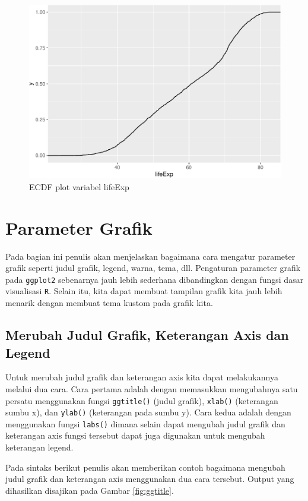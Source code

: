 \documentclass[]{book}
\begin{document}
\begin{figure}

{\centering \includegraphics[width=0.7\linewidth]{EnvStat_files/figure-latex/ggecdf-1} 

}

\caption{ECDF plot variabel lifeExp}\label{fig:ggecdf}
\end{figure}

\section{Parameter Grafik}\label{parameter-grafik}

Pada bagian ini penulis akan menjelaskan bagaimana cara mengatur
parameter grafik seperti judul grafik, legend, warna, tema, dll.
Pengaturan parameter grafik pada \texttt{ggplot2} sebenarnya jauh lebih
sederhana dibandingkan dengan fungsi dasar visualisasi \texttt{R}.
Selain itu, kita dapat membuat tampilan grafik kita jauh lebih menarik
dengan membuat tema kustom pada grafik kita.

\subsection{Merubah Judul Grafik, Keterangan Axis dan
Legend}\label{merubah-judul-grafik-keterangan-axis-dan-legend}

Untuk merubah judul grafik dan keterangan axis kita dapat melakukannya
melalui dua cara. Cara pertama adalah dengan memasukkan mengubahnya satu
persatu menggunakan fungsi \texttt{ggtitle()} (judul grafik),
\texttt{xlab()} (keterangan sumbu x), dan \texttt{ylab()} (keterangan
pada sumbu y). Cara kedua adalah dengan menggunakan fungsi
\texttt{labs()} dimana selain dapat mengubah judul grafik dan keterangan
axis fungsi tersebut dapat juga digunakan untuk mengubah keterangan
legend.

Pada sintaks berikut penulis akan memberikan contoh bagaimana mengubah
judul grafik dan keterangan axis menggunakan dua cara tersebut. Output
yang dihasilkan disajikan pada Gambar \ref{fig:ggtitle}.
\end{document}
